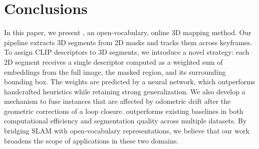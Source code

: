 \section{Conclusions}
In this paper, we present \ours, an open-vocabulary, online 3D mapping method.
Our pipeline extracts 3D segments from 2D masks and tracks them across keyframes.
To assign CLIP descriptors to 3D segments, we introduce a novel strategy: each 2D segment receives a single descriptor computed as a weighted sum of embeddings from the full image, the masked region, and its surrounding bounding box. The weights are predicted by a neural network, which outperforms handcrafted heuristics while retaining strong generalization.
We also develop a mechanism to fuse instances that are affected by odometric drift after the geometric corrections of a loop closure.
\ours outperforms existing baselines in both computational efficiency and segmentation quality across multiple datasets.
By bridging SLAM with open-vocabulary representations, we believe that our work broadens the scope of applications in these two domains.